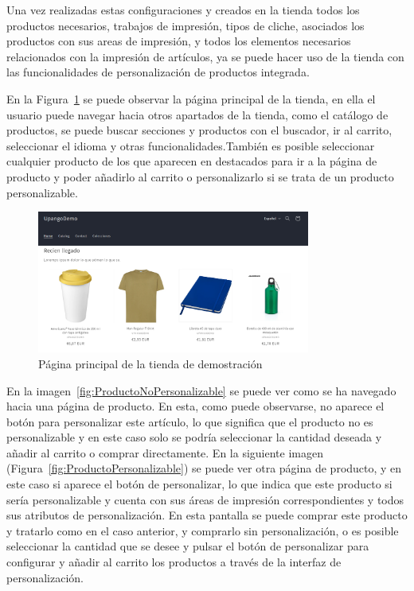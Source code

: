 \documentclass[12pt]{article}
\begin{document}
Una vez realizadas estas configuraciones y creados en la tienda todos los productos necesarios, trabajos de impresión, tipos de cliche, asociados los productos con sus areas de impresión, y todos los elementos necesarios relacionados con
la impresión de artículos, ya se puede hacer uso de la tienda con las funcionalidades de personalización de productos integrada.

En la Figura~\ref{fig:HomeTiendaDemo} se puede observar la página principal de la tienda, en ella el usuario puede navegar hacia otros apartados de la tienda, como el catálogo de productos, se puede buscar secciones y productos con el buscador, ir al carrito, seleccionar el idioma y otras funcionalidades.También
es posible seleccionar cualquier producto de los que aparecen en destacados para ir a la página de producto y poder añadirlo al carrito o personalizarlo si se trata de un producto
personalizable.

\begin{figure}[ht]
    \centering
    \includegraphics[width=0.8\textwidth]{imagenes/ManualUsuario/HomeTiendaDemo.png}
    \caption{\label{fig:HomeTiendaDemo}Página principal de la tienda de demostración}
    \vspace{\fill}
\end{figure}

En la imagen~\ref{fig:ProductoNoPersonalizable} se puede ver como se ha navegado hacia una página de producto. En esta, como puede observarse, no aparece el botón para personalizar este
artículo, lo que significa que el producto no es personalizable y en este caso solo se podría seleccionar la cantidad deseada y añadir al carrito o comprar directamente.
En la siguiente imagen (Figura~\ref{fig:ProductoPersonalizable}) se puede ver otra página de producto, y en este caso si aparece el botón de personalizar, lo que indica que este producto
si sería personalizable y cuenta con sus áreas de impresión correspondientes y todos sus atributos de personalización. En esta pantalla se puede comprar este producto y tratarlo como en el caso anterior,
y comprarlo sin personalización, o es posible seleccionar la cantidad que se desee y pulsar el botón de personalizar para configurar y añadir al carrito los productos a través de la interfaz de personalización.
\end{document}
